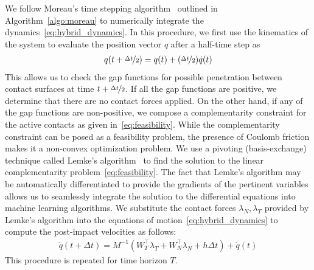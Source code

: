 We follow Moreau's time stepping algorithm~\cite{glocker2005formulation}
outlined in Algorithm~\eqref{algo:moreau} to numerically integrate the
dynamics~\eqref{eq:hybrid_dynamics}. 
%
In this procedure, we first use the kinematics of the system to evaluate the
position vector $q$ after a half-time step as
\begin{align*}
  q(t+\nicefrac{\Delta t}{2}) = q(t) +  (\nicefrac{\Delta t}{2}) \dot{q}(t) 
\end{align*}
%
This allows us to check the gap functions for possible penetration between
contact surfaces at time $t+\nicefrac{\Delta t}{2}$.
%
If all the gap functions are positive, we determine that there are no
contact forces applied.
%
On the other hand, if any of the gap functions are non-positive, we compose a
complementarity constraint for the active contacts as given
in~\eqref{eq:feasibility}.
%
While the complementarity constraint can be posed as a feasibility problem, the
presence of Coulomb friction makes it a non-convex optimization problem. 
%
We use a pivoting (basis-exchange) technique called Lemke's
algorithm~\cite{acary2008numerical} to find the solution to the linear
complementarity problem~\eqref{eq:feasibility}. The fact that Lemke's algorithm
may be automatically differentiated to provide the gradients of the pertinent
variables allows us to seamlessly integrate the solution to the differential
equations into machine learning algorithms.
%
We substitute the contact forces $\lambda_N, \lambda_T$ provided by Lemke's
algorithm into the equations of motion~\eqref{eq:hybrid_dynamics} to compute the
post-impact velocities as follows:
\begin{align*}
  \dot{q}(t+\Delta t) = M^{-1}(W_T^\top \lambda_T + W_N^\top \lambda_N + h\Delta t) + \dot{q}(t)
\end{align*}
%
This procedure is repeated for time horizon $T$.

